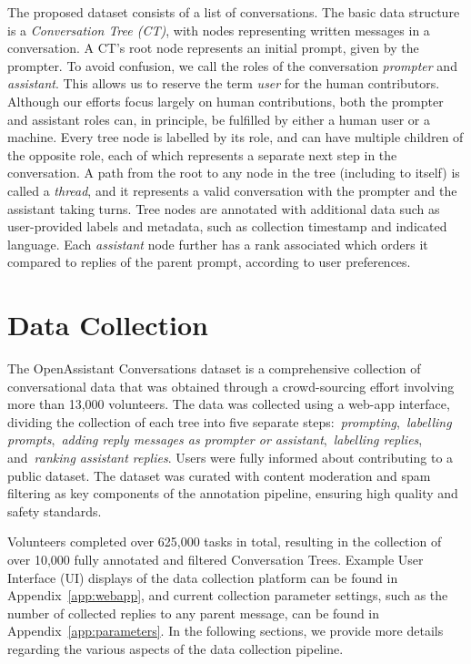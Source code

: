 The proposed dataset consists of a list of conversations. The basic data structure is a \emph{Conversation Tree (CT)}, with nodes representing written messages in a conversation. A CT's root node represents an initial prompt, given by the prompter. To avoid confusion, we call the roles of the conversation \emph{prompter} and \emph{assistant}.
This allows us to reserve the term \emph{user} for the human contributors. Although our efforts focus largely on human contributions, both the prompter and assistant roles can, in principle, be fulfilled by either a human user or a machine. Every tree node is labelled by its role, and can have multiple children of the opposite role, each of which represents a separate next step in the conversation. A path from the root to any node in the tree (including to itself) is called a \emph{thread}, and it represents a valid conversation with the prompter and the assistant taking turns. Tree nodes are annotated with additional data such as user-provided labels and metadata, such as collection timestamp and indicated language. Each \emph{assistant} node further has a rank associated which orders it compared to replies of the parent prompt, according to user preferences.

\section{Data Collection}
\label{sec:collection}

The OpenAssistant Conversations dataset is a comprehensive collection of conversational data that was obtained through a crowd-sourcing effort involving more than 13,000 volunteers. The data was collected using a web-app interface, dividing the collection of each tree into five separate steps:~\emph{prompting},~\emph{labelling prompts},~\emph{adding reply messages as prompter or assistant},~\emph{labelling replies}, and~\emph{ranking assistant replies}. Users were fully informed about contributing to a public dataset. The dataset was curated with content moderation and spam filtering as key components of the annotation pipeline, ensuring high quality and safety standards.

Volunteers completed over 625,000 tasks in total, resulting in the collection of over 10,000 fully annotated and filtered Conversation Trees. Example User Interface (UI) displays of the data collection platform can be found in Appendix~\ref{app:webapp}, and current collection parameter settings, such as the number of collected replies to any parent message, can be found in Appendix~\ref{app:parameters}. In the following sections, we provide more details regarding the various aspects of the data collection pipeline.

